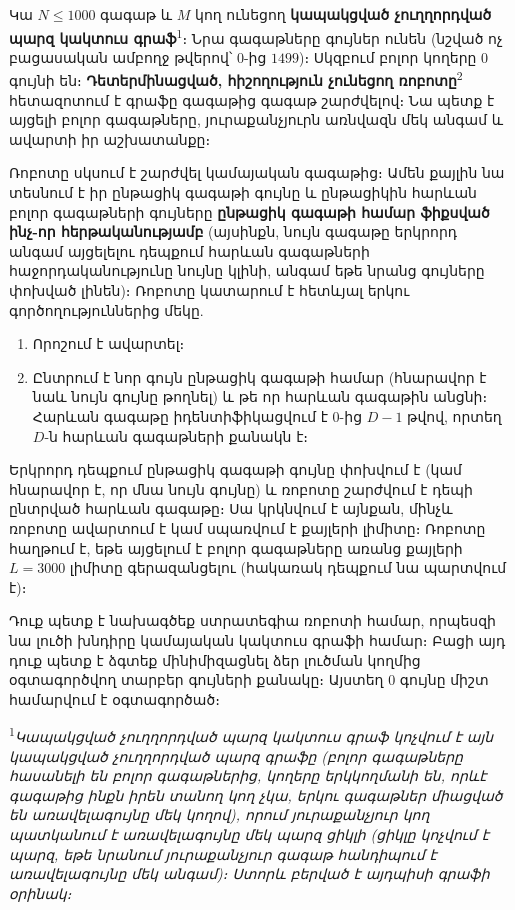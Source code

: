 \documentclass[12pt]{article}
\begin{document}
\renewcommand{\round}{Day 2}
\renewcommand{\problemName}{Task Navigation}
\renewcommand{\lang}{Armenian}

\renewcommand{\tl}{$3$ sec.}
\renewcommand{\ml}{$512$ MB}
\problem{\problemName}

Կա $N \leq 1000$ գագաթ և $M$ կող ունեցող  \textbf{կապակցված չուղղորդված պարզ կակտուս գրաֆ}\textsuperscript{1}։ Նրա գագաթները գույներ ունեն (նշված ոչ բացասական ամբողջ թվերով՝ $0$-ից $1499$)։ Սկզբում բոլոր կողերը  $0$ գույնի են։ \textbf{Դետերմինացված, հիշողություն չունեցող ռոբոտը}\textsuperscript{2} հետազոտում է գրաֆը գագաթից գագաթ շարժվելով։ Նա պետք է այցելի բոլոր գագաթները, յուրաքանչյուրն առնվազն մեկ անգամ և ավարտի իր աշխատանքը։

Ռոբոտը սկսում է շարժվել կամայական գագաթից։ Ամեն քայլին նա տեսնում է իր ընթացիկ գագաթի գույնը և ընթացիկին հարևան բոլոր գագաթների գույները \textbf{ընթացիկ գագաթի համար ֆիքսված ինչ-որ հերթականությամբ} (այսինքն, նույն գագաթը երկրորդ անգամ այցելելու դեպքում հարևան գագաթների հաջորդականությունը նույնը կլինի, անգամ եթե նրանց գույները փոխված լինեն)։ Ռոբոտը կատարում է հետևյալ երկու գործողություններից մեկը.
\begin{enumerate}
    \item Որոշում է ավարտել։
    \item Ընտրում է նոր գույն ընթացիկ գագաթի համար  (հնարավոր է նաև նույն գույնը թողնել) և թե որ հարևան գագաթին անցնի։ Հարևան գագաթը իդենտիֆիկացվում է $0$-ից $D-1$ թվով, որտեղ $D$-ն հարևան գագաթների քանակն է։
\end{enumerate}

Երկրորդ դեպքում ընթացիկ գագաթի գույնը փոխվում է (կամ հնարավոր է, որ մնա նույն գույնը) և ռոբոտը շարժվում է դեպի ընտրված հարևան գագաթը։ Սա կրկնվում է այնքան, մինչև ռոբոտը ավարտում է  կամ սպառվում է քայլերի լիմիտը։ Ռոբոտը հաղթում է, եթե այցելում է բոլոր գագաթները առանց քայլերի $L = 3000$ լիմիտը գերազանցելու (հակառակ դեպքում նա պարտվում է)։

Դուք պետք է նախագծեք ստրատեգիա ռոբոտի համար, որպեսզի նա լուծի խնդիրը կամայական կակտուս գրաֆի համար։ Բացի այդ դուք պետք է ձգտեք մինիմիզացնել ձեր լուծման կողմից օգտագործվող տարբեր գույների քանակը։ Այստեղ 0 գույնը միշտ համարվում է օգտագործած։

\textsuperscript{1}\textit{Կապակցված չուղղորդված պարզ կակտուս գրաֆ կոչվում է այն կապակցված չուղղորդված պարզ գրաֆը (բոլոր գագաթները հասանելի են բոլոր գագաթներից, կողերը երկկողմանի են, որևէ գագաթից ինքն իրեն տանող կող չկա, երկու գագաթներ միացված են առավելագույնը մեկ կողով), որում յուրաքանչյուր կող պատկանում է առավելագույնը մեկ պարզ ցիկլի (ցիկլը կոչվում է պարզ, եթե նրանում յուրաքանչյուր գագաթ հանդիպում է առավելագույնը մեկ անգամ)։ Ստորև բերված է այդպիսի գրաֆի օրինակ։}
\end{document}

